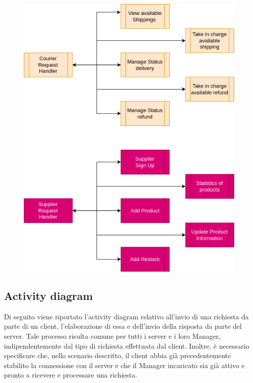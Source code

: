 \documentclass[12pt]{report}
\begin{document}
    \begin{figure}[H]
        \centering
        \includegraphics[scale=0.6]{images/System Architecture 2.png}
        \label{fig:Manager_architecture_2}
    \end{figure}

    \newpage
    
    \subsection{Activity diagram}

    Di seguito viene riportato l'activity diagram relativo all'invio di una richiesta da parte di un client, l'elaborazione di essa e dell'invio della risposta da parte del server. Tale processo risulta comune per tutti i server e i loro Manager, indipendentemente dal tipo di richiesta effettuata dal client. Inoltre, è necessario specificare che, nello scenario descritto, il client abbia già precedentemente stabilito la connessione con il server e che il Manager incaricato sia già attivo e pronto a ricevere e processare una richiesta.
    
\end{document}
